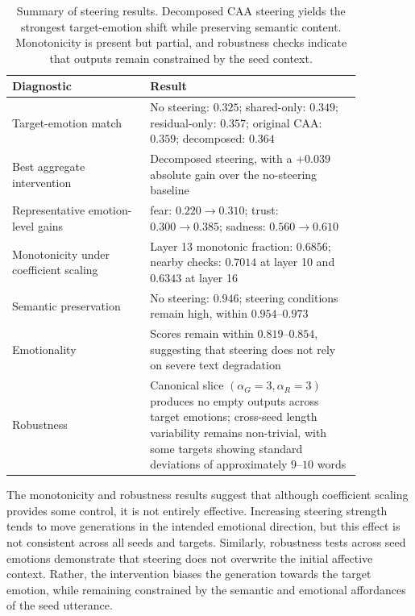 \begin{table}[H]
\centering
\small
\begin{tabular}{p{0.34\linewidth} p{0.52\linewidth}}
\toprule
\textbf{Diagnostic} & \textbf{Result} \\
\midrule
Target-emotion match &
No steering: $0.325$; shared-only: $0.349$; residual-only: $0.357$; original CAA: $0.359$; decomposed: $0.364$ \\
\midrule
Best aggregate intervention &
Decomposed steering, with a $+0.039$ absolute gain over the no-steering baseline \\
\midrule
Representative emotion-level gains &
fear: $0.220 \rightarrow 0.310$; trust: $0.300 \rightarrow 0.385$; sadness: $0.560 \rightarrow 0.610$ \\
\midrule
Monotonicity under coefficient scaling &
Layer 13 monotonic fraction: $0.6856$; nearby checks: $0.7014$ at layer 10 and $0.6343$ at layer 16 \\
\midrule
Semantic preservation &
No steering: $0.946$; steering conditions remain high, within $0.954$--$0.973$ \\
\midrule
Emotionality &
Scores remain within $0.819$--$0.854$, suggesting that steering does not rely on severe text degradation \\
\midrule
Robustness &
Canonical slice $(\alpha_G=3,\alpha_R=3)$ produces no empty outputs across target emotions; cross-seed length variability remains non-trivial, with some targets showing standard deviations of approximately $9$--$10$ words \\
\bottomrule
\end{tabular}
\caption{Summary of steering results. Decomposed CAA steering yields the strongest target-emotion shift while preserving semantic content. Monotonicity is present but partial, and robustness checks indicate that outputs remain constrained by the seed context.}
\label{tab:steering_results}
\end{table}

The monotonicity and robustness results suggest that although coefficient scaling provides some control, it is not entirely effective. Increasing steering strength tends to move generations in the intended emotional direction, but this effect is not consistent across all seeds and targets. Similarly, robustness tests across seed emotions demonstrate that steering does not overwrite the initial affective context. Rather, the intervention biases the generation towards the target emotion, while remaining constrained by the semantic and emotional affordances of the seed utterance.

